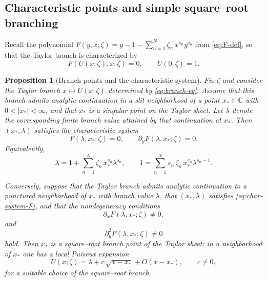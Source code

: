 \documentclass[11pt]{amsart}
\numberwithin{equation}{section}
\theoremstyle{plain}
\newtheorem{proposition}[theorem]{Proposition}
\theoremstyle{definition}
\theoremstyle{remark}
\newcommand{\CC}{\mathbb{C}}
\begin{document}
\subsection{Characteristic points and simple square--root branching}
Recall the polynomial $F(y,x;\zeta)=y-1-\sum_{n=1}^{N}\zeta_n\,x^{s_n}y^{s_n}$
from \eqref{eq:F-def},
so that the Taylor branch is characterized by
\begin{equation}\label{eq:branch-eq}
	F(U(x;\zeta),x;\zeta)=0,
	\qquad
	U(0;\zeta)=1.
\end{equation}


\begin{proposition}[Branch points and the characteristic system]\label{prop:xi-star-system}
	Fix $\zeta$ and consider the Taylor branch $x\mapsto U(x;\zeta)$ determined by \eqref{eq:branch-eq}.
	Assume that this branch admits analytic continuation in a slit neighborhood of a point $x_*\in\CC$
	with $0<|x_*|<\infty$, and that $x_*$ is a singular point on the Taylor sheet. Let $\lambda$ denote
	the corresponding finite branch value attained by that continuation at $x_*$. Then $(x_*,\lambda)$
	satisfies the \emph{characteristic system}
	\begin{equation}\label{eq:char-system-F}
		F(\lambda,x_*;\zeta)=0,
		\qquad
		\partial_yF(\lambda,x_*;\zeta)=0.
	\end{equation}
	Equivalently,
	\begin{equation}\label{eq:char-system}
		\lambda
		=
		1+\sum_{n=1}^N \zeta_n\,x_*^{s_n} \lambda^{s_n},
		\qquad
		1
		=
		\sum_{n=1}^N s_n\,\zeta_n\,x_*^{s_n} \lambda^{s_n-1}.
	\end{equation}

	Conversely, suppose that the Taylor branch admits analytic continuation to a
	punctured neighborhood of $x_*$ with branch value $\lambda$, that
	$(x_*,\lambda)$ satisfies \eqref{eq:char-system-F}, and that the
	nondegeneracy conditions
	\begin{equation}\label{eq:Fx-nondeg}
		\partial_xF(\lambda,x_*;\zeta)\neq0,
	\end{equation}
	and
	\begin{equation}\label{eq:Fyy-nondeg}
		\partial_y^2F(\lambda,x_*;\zeta)\neq0
	\end{equation}
	hold. Then $x_*$ is a square--root branch point of the Taylor sheet: in a neighborhood of $x_*$ one has a
	local Puiseux expansion
	\[
		U(x;\zeta)=\lambda + c\,\sqrt{x-x_*}+O(x-x_*),
		\qquad c\neq0,
	\]
	for a suitable choice of the square--root branch.
\end{proposition}
\end{document}
